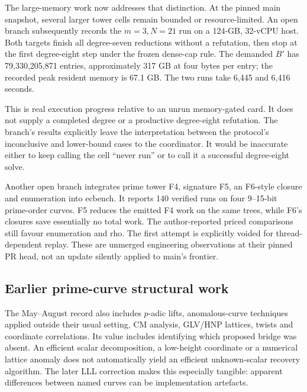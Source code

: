 The large-memory work now addresses that distinction. At the pinned main
snapshot, several larger tower cells remain bounded or resource-limited.
An open branch subsequently records the $m=3,N=21$ run on a 124-GB,
32-vCPU host. Both targets finish all degree-seven reductions without a
refutation, then stop at the first degree-eight step under the frozen
dense-cap rule. The demanded $B'$ has 79,330,205,871 entries, approximately
317 GB at four bytes per entry; the recorded peak resident memory is
67.1 GB. The two runs take 6,445 and 6,416 seconds.

This is real execution progress relative to an unrun memory-gated card.
It does not supply a completed degree or a productive degree-eight
refutation. The branch's results explicitly leave the interpretation
between the protocol's inconclusive and lower-bound cases to the
coordinator. It would be inaccurate either to keep calling the cell
``never run'' or to call it a successful degree-eight solve.

Another open branch integrates prime tower F4, signature F5, an F6-style
closure and enumeration into ecbench. It reports 140 verified runs on
four 9--15-bit prime-order curves. F5 reduces the emitted F4 work on the
same trees, while F6's closures save essentially no total work. The
author-reported priced comparisons still favour enumeration and rho.
The first attempt is explicitly voided for thread-dependent replay.
These are unmerged engineering observations at their pinned PR head,
not an update silently applied to main's frontier.

\subsection{Earlier prime-curve structural work}

The May--August record also includes $p$-adic lifts, anomalous-curve
techniques applied outside their usual setting, CM analysis, GLV/HNP
lattices, twists and coordinate correlations. Its value includes
identifying which proposed bridge was absent. An efficient scalar
decomposition, a low-height coordinate or a numerical lattice anomaly
does not automatically yield an efficient unknown-scalar recovery
algorithm. The later LLL correction makes this especially tangible:
apparent differences between named curves can be implementation
artefacts.
